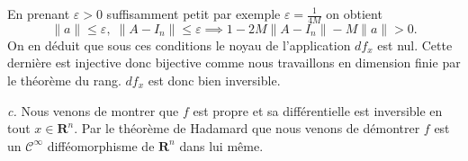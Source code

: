 \documentclass[12pt]{article}
\newcommand{\R}{\mathbf{R}}
\begin{document}
En prenant $\varepsilon > 0$ suffisamment petit par exemple $\varepsilon = \frac{1}{4M}$ on obtient \[
\|a\| \le \varepsilon, \; \|A-I_{n}\| \le \varepsilon \implies 1-2M\|A-I_{n}\|-M\|a\| > 0
.\] On en déduit que sous ces conditions le noyau de l'application $df_{x}$ est nul. Cette dernière est injective donc bijective comme nous travaillons en dimension finie par le théorème du rang. $df_{x}$ est donc bien inversible.

\medskip

\textit{c.} Nous venons de montrer que $f$ est propre et sa différentielle est inversible en tout $x \in \R^{n}$. Par le théorème de Hadamard que nous venons de démontrer $f$ est un $\mathcal{C}^{\infty}$ difféomorphisme de $\R^{n}$ dans lui même.
\end{document}
